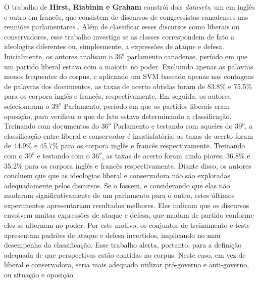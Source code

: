 O trabalho de \textbf{Hirst, Riabinin e Graham} constrói dois \emph{datasets}, um em inglês e outro em francês, que consistem de discursos de congressistas canadenses nas reuniões parlamentares \cite{hirst-et-al}. Além de classificar esses discursos como liberais ou conservadores, esse trabalho investiga se as classes correspondem de fato a ideologias diferentes ou, simplesmente, a expressões de ataque e defesa. Inicialmente, os autores analisam o \ensuremath{36^o} parlamento canadense, período em que um partido liberal estava com a maioria no poder. Excluindo apenas as palavras menos frequentes do corpus, e aplicando um SVM baseado apenas nas contagens de palavras dos documentos, as taxas de acerto obtidas foram de 83.8\% e 75.5\% para os corpora inglês e francês, respectivamente. Em seguida, os autores selecionaram o \ensuremath{39^o} Parlamento, período em que os partidos liberais eram oposição, para verificar o que de fato estava determinando a classificação. Treinando com documentos do \ensuremath{36^o} Parlamento e testando com aqueles do \ensuremath{39^o}, a classificação entre liberal e conservador é insatisfatória: as taxas de acerto foram de 44.9\% e 45.7\% para os corpora inglês e francês respectivamente. Treinando com o \ensuremath{39^o} e testando com o \ensuremath{36^o}, as taxas de acerto foram ainda piores: 36.8\% e 35.2\% para os corpora inglês e francês respectivamente. Diante disso, os autores concluem que que as ideologias liberal e conservadora não são exploradas adequadamente pelos discursos. Se o fossem, e considerando que elas não mudaram significativamente de um parlamento para o outro, estes últimos experimentos apresentariam resultados melhores. Eles indicam que os discursos envolvem muitas expressões de ataque e defesa, que mudam de partido conforme eles se alternam no poder. Por este motivo, os conjuntos de treinamento e teste apresentam padrões de ataque e defesa invertidos, implicando no mau desempenho da classificação. Esse trabalho alerta, portanto, para a definição adequada de que perspectivas estão contidas no corpus. Neste caso, em vez de liberal e conservadora, seria mais adequado utilizar pró-governo e anti-governo, ou situação e oposição. %

